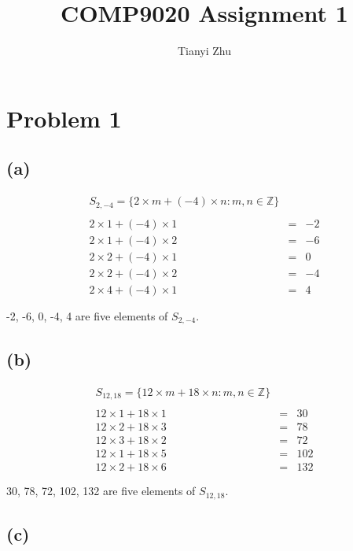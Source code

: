 \documentclass{article} %
\begin{document}
\title{COMP9020 Assignment 1}
\author{Tianyi Zhu} %
\date{} %
\maketitle %

\section*{Problem 1} %
\subsection*{(a)} %
\[\begin{array}{rclr}
S_{2,-4}=\{2\times m+(-4)\times n:m,n\in \mathbb{Z}\}\\
\\
2\times 1+(-4)\times 1&=&-2\\
2\times 1+(-4)\times 2&=&-6\\
2\times 2+(-4)\times 1&=&0\\
2\times 2+(-4)\times 2&=&-4\\
2\times 4+(-4)\times 1&=&4\\
\\
\end{array}\]
-2, -6, 0, -4, 4 are five elements of $S_{2,-4}$.
\subsection*{(b)}
\[\begin{array}{rclr}
S_{12,18}=\{12\times m+18\times n:m,n\in \mathbb{Z}\}\\
\\
12\times 1+18\times 1&=&30\\
12\times 2+18\times 3&=&78\\
12\times 3+18\times 2&=&72\\
12\times 1+18\times 5&=&102\\
12\times 2+18\times 6&=&132\\
\\
\end{array}\]
30, 78, 72, 102, 132 are five elements of $S_{12,18}$.

\subsection*{(c)}
\end{document}
